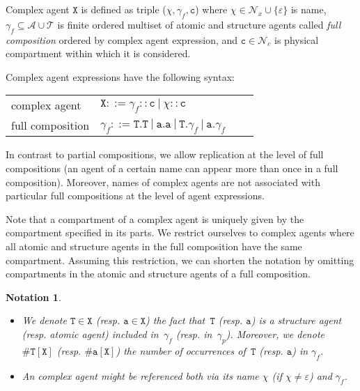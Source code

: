 \documentclass{entcs}
\renewcommand{\~}[0]{\texttildelow}
\newtheorem{notation}[thm]{Notation}
\begin{document}
\begin{definition}
Complex agent $\mathtt{X}$ is defined as triple ($\chi, \gamma_f, \mathtt{c}$) where $\chi \in \mathcal{N}_{x} \cup \{\varepsilon\}$ is name, $\gamma_f \subseteq \mathcal{A} \cup \mathcal{T}$ is finite ordered multiset of atomic and structure agents called \emph{full composition} ordered by complex agent expression, and $\mathtt{c} \in \mathcal{N}_{c}$ is physical compartment within which it is considered.
\end{definition}

Complex agent expressions have the following syntax:

\begin{center}
{\small
\hspace*{-1 cm}\begin{tabular}{ ll ll }
 complex agent & $\mathtt{X}::=\gamma_f::\mathtt{c}~|~\chi::\mathtt{c}$\\
 full composition & $\gamma_f ::= \mathtt{T}.\mathtt{T}~|~\mathtt{a}.\mathtt{a}~|~\mathtt{T}.\gamma_{f}~|~\mathtt{a}.\gamma_{f}$
\end{tabular}
}
\end{center}

In contrast to partial compositions, we allow replication at the level of full compositions (an agent of a certain name can appear more than once in a full composition). Moreover, names of complex agents are not associated with particular full compositions at the level of agent expressions.

Note that a compartment of a complex agent is uniquely given by the compartment specified in its parts. We restrict ourselves to complex agents where all atomic and structure agents in the full composition have the same compartment. Assuming this restriction, we can shorten the notation by omitting compartments in the atomic and structure agents of a full composition. 

\begin{notation}
~
\begin{itemize}
\item  We denote $\mathtt{T}\in \mathtt{X}$ (resp. $\mathtt{a}\in \mathtt{X}$) the fact that~$\mathtt{T}$ (resp. $\mathtt{a}$) is a structure agent (resp. atomic agent) included in~$\gamma_f$ (resp. in~$\gamma_p$). 
Moreover, we denote $\#\mathtt{T}[\mathtt{X}]$ (resp. $\#\mathtt{a}[\mathtt{X}]$) the number of occurrences of~$\mathtt{T}$ (resp. $\mathtt{a}$) in $\gamma_f$. 
\item An complex agent might be referenced both via its name $\chi$ (if $\chi \neq \varepsilon$) and $\gamma_f$.
\end{itemize}
\end{notation}
\end{document}
